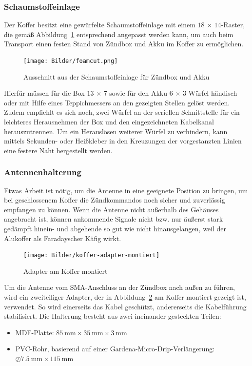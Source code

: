 \documentclass[paper=a4, parskip, numbers=noenddot, toc=listof, headsepline]{scrbook}
\begin{document}
				\subsubsection{Schaumstoffeinlage}

					Der Koffer besitzt eine gewürfelte Schaumstoffeinlage mit einem $18\,\times\,14$-Raster, die gemäß Abbildung~\ref{fig:foamcut} entsprechend angepasst werden kann, um auch beim Transport einen festen Stand von Zündbox und Akku im Koffer zu ermöglichen.

					\begin{figure}
						\centering
						\texttt{[image: Bilder/foamcut.png]}
						\caption{Ausschnitt aus der Schaumstoffeinlage für Zündbox und Akku}
						\label{fig:foamcut}
					\end{figure}

					Hierfür müssen für die Box $13\,\times\,7$ sowie für den Akku $6\,\times\,3$ Würfel händisch oder mit Hilfe eines Teppichmessers an den gezeigten Stellen gelöst werden. Zudem empfiehlt es sich noch, zwei Würfel an der seriellen Schnittstelle für ein leichteres Herausnehmen der Box und den eingezeichneten Kabelkanal herauszutrennen. Um ein Herauslösen weiterer Würfel zu verhindern, kann mittels Sekunden- oder Heißkleber in den Kreuzungen der vorgestanzten Linien eine festere Naht hergestellt werden.

				\subsubsection{Antennenhalterung}

					Etwas Arbeit ist nötig, um die Antenne in eine geeignete Position zu bringen, um bei geschlossenem Koffer die Zündkommandos noch sicher und zuverlässig empfangen zu können. Wenn die Antenne nicht außerhalb des Gehäuses angebracht ist, können ankommende Signale nicht bzw. nur äußerst stark gedämpft hinein- und abgehende so gut wie nicht hinausgelangen, weil der Alukoffer als Faradayscher Käfig wirkt.

					\begin{figure}
						\centering
						\texttt{[image: Bilder/koffer-adapter-montiert]}
						\caption{Adapter am Koffer montiert}
						\label{fig:koffer-adapter-montiert}
					\end{figure}

					Um die Antenne vom SMA-Anschluss an der Zündbox nach außen zu führen, wird ein zweiteiliger Adapter, der in Abbildung~\ref{fig:koffer-adapter-montiert} am Koffer montiert gezeigt ist, verwendet. So wird einerseits das Kabel geschützt, andererseits die Kabelführung stabilisiert. Die Halterung besteht aus zwei ineinander gesteckten Teilen:
					\begin{itemize}
						\item
						      MDF-Platte: $\SI{85}{\milli\metre} \times \SI{35}{\milli\metre} \times \SI{3}{\milli\metre}$
						\item
						      PVC-Rohr, basierend auf einer Gardena-Micro-Drip-Verlängerung: $\oslash\SI{7,5}{\milli\metre} \times \SI{115}{\milli\metre}$
					\end{itemize}
\end{document}
